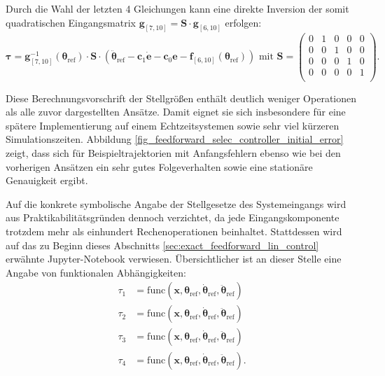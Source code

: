 Durch die Wahl der letzten 4 Gleichungen kann eine direkte Inversion der somit quadratischen Eingangsmatrix $\mathbf{g}_{[7, 10]} = \mathbf{S} \cdot \mathbf{g}_{[6, 10]}$ erfolgen:
\begin{equation}
	\boldsymbol{\tau}= \mathbf{g}^{-1}_{[7, 10]}(\boldsymbol{\theta}_{\text{ref}}) \cdot \mathbf{S} \cdot (\ddot{\boldsymbol{\theta}}_{\text{ref}} - \mathbf{c}_{1} \mathbf{\dot{e}} - \mathbf{c}_{0} \mathbf{e} - \mathbf{f}_{[6, 10]}(\boldsymbol{\theta}_{\text{ref}})) \text{ mit } 
	\mathbf{S} = 
	\begin{pmatrix}
	0 & 1 & 0 & 0 & 0 \\
	0 & 0 & 1 & 0 & 0 \\
	0 & 0 & 0 & 1 & 0 \\
	0 & 0 & 0 & 0 & 1 \\
	\end{pmatrix}.
\end{equation}

Diese Berechnungsvorschrift der Stellgrößen enthält deutlich weniger Operationen als alle zuvor dargestellten Ansätze. Damit eignet sie sich insbesondere für eine spätere Implementierung auf einem Echtzeitsystemen sowie sehr viel kürzeren Simulationszeiten. Abbildung \ref{fig_feedforward_selec_controller_initial_error} zeigt, dass sich für Beispieltrajektorien mit Anfangsfehlern ebenso wie bei den vorherigen Ansätzen ein sehr gutes Folgeverhalten sowie eine stationäre Genauigkeit ergibt.

Auf die konkrete symbolische Angabe der Stellgesetze des Systemeingangs wird aus Praktikabilitätsgründen dennoch verzichtet, da jede Eingangskomponente trotzdem mehr als einhundert Rechenoperationen beinhaltet. Stattdessen wird auf das zu Beginn dieses Abschnitts \ref{sec:exact_feedforward_lin_control} erwähnte Jupyter-Notebook verwiesen. Übersichtlicher ist an dieser Stelle eine Angabe von funktionalen Abhängigkeiten:
\begin{subequations}
	\begin{align}
		\tau_1 &= \mathrm{func}(\mathbf{x}, \boldsymbol{\theta}_{\mathrm{ref}}, \dot{\boldsymbol{\theta}}_{\mathrm{ref}}, \ddot{\boldsymbol{\theta}}_{\mathrm{ref}}) \\
		\tau_2 &= \mathrm{func}(\mathbf{x}, \boldsymbol{\theta}_{\mathrm{ref}}, \dot{\boldsymbol{\theta}}_{\mathrm{ref}}, \ddot{\boldsymbol{\theta}}_{\mathrm{ref}}) \\
		\tau_3 &= \mathrm{func}(\mathbf{x}, \boldsymbol{\theta}_{\mathrm{ref}}, \dot{\boldsymbol{\theta}}_{\mathrm{ref}}, \ddot{\boldsymbol{\theta}}_{\mathrm{ref}}) \\
		\tau_4 &= \mathrm{func}(\mathbf{x}, \boldsymbol{\theta}_{\mathrm{ref}}, \dot{\boldsymbol{\theta}}_{\mathrm{ref}}, \ddot{\boldsymbol{\theta}}_{\mathrm{ref}}).
	\end{align}
\end{subequations}

